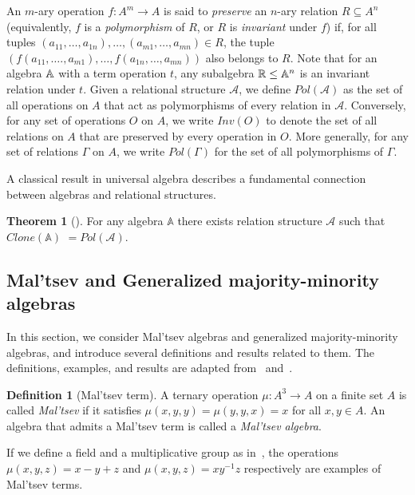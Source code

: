 \documentclass{article}
\newcommand{\A}{\ensuremath\mathbb{A}}
\newcommand{\R}{\mathbb{R}}
\theoremstyle{definition}
\newtheorem{df}{Definition}
\theoremstyle{theorem}
\newtheorem{thm}{Theorem}
\theoremstyle{theorem}
\theoremstyle{remark}
\theoremstyle{remark}
\theoremstyle{example}
\theoremstyle{notation}
\theoremstyle{theorem}
\begin{document}
    An $m$-ary operation $f: A^m \rightarrow A$ is said to \emph{preserve} an $n$-ary relation $R \subseteq A^n$ (equivalently, $f$ is a \emph{polymorphism} of $R$, or $R$ is \emph{invariant} under $f$) if, for all tuples $(a_{11}, \ldots, a_{1n}), \ldots, (a_{m1}, \ldots, a_{mn}) \in R$, the tuple $(f(a_{11},\ldots .,a_{m1}),\ldots,f(a_{1n},\ldots,a_{mn}))$ also belongs to $R$. Note that for an algebra $\A$ with a term operation $t$, any subalgebra $\R\leq \A^n$ is an invariant relation under $t$. Given a relational structure $\mathcal{A}$, we define $Pol(\mathcal{A})$ as the set of all operations on $A$ that act as polymorphisms of every relation in $\mathcal{A}$. Conversely, for any set of operations $O$ on $A$, we write $Inv(O)$ to denote the set of all relations on $A$ that are preserved by every operation in $O$. More generally, for any set of relations $\Gamma$ on $A$, we write $Pol(\Gamma)$ for the set of all polymorphisms of $\Gamma$.  

    A classical result in universal algebra describes a fundamental connection between algebras and relational structures.

\begin{thm}[\cite{Kibernetika}]\label{fjjduh87}
For any algebra $\mathbb{A}$ there exists relation structure $\mathcal{A}$ such that $Clone(\mathbb{A})$ $ =Pol(\mathcal{A})$.
\end{thm}
 



\subsection{Mal'tsev and Generalized majority-minority algebras}\label{alka;hfsdg}

In this section, we consider Mal’tsev algebras and generalized majority-minority algebras, and introduce several definitions and results related to them. The definitions, examples, and results are adapted from~\cite{doi:10.1137/050628957} and~\cite{lmcs:2237}. 


\begin{df}[Mal’tsev term]
    A ternary operation $\mu:A^3\to A$ on a finite set $A$ is called
\emph{Mal’tsev} if it satisfies $\mu(x, y, y) =\mu(y, y, x) = x$ for all $x,y\in A$.
An algebra that admits a Mal'tsev term is called a \emph{Mal'tsev algebra}.
\end{df}

If we define a field and a multiplicative group as in~\cite{BurrisSankappanavar1981}, the operations $\mu(x, y, z) = x - y + z$ and $\mu(x, y, z) = x y^{-1} z$ respectively are examples of Mal’tsev terms.
\end{document}
